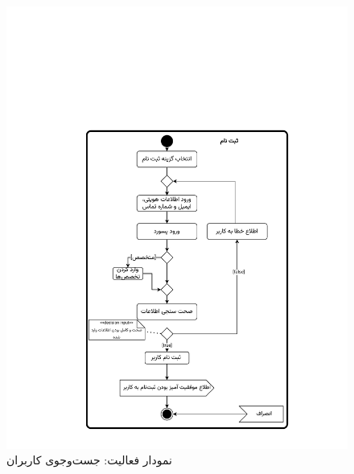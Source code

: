 \begin{figure}
	\centering
	\includegraphics[scale=0.8, page=4]{figs/OOD-activity1-10.pdf}
	\caption{نمودار فعالیت: جست‌وجوی کاربران}
\end{figure}
\FloatBarrier
\newpage

